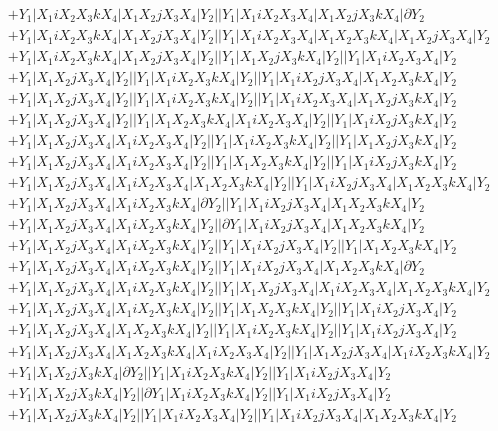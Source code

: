 \documentclass{article}[12pt]
\begin{document}
\begin{align*}
 & +Y_1|X_1iX_2X_3kX_4|X_1X_2jX_3X_4|Y_2||Y_1|X_1iX_2X_3X_4|X_1X_2jX_3kX_4|\partial Y_2\\ 
 & +Y_1|X_1iX_2X_3kX_4|X_1X_2jX_3X_4|Y_2||Y_1|X_1iX_2X_3X_4|X_1X_2X_3kX_4|X_1X_2jX_3X_4|Y_2\\ 
 & +Y_1|X_1iX_2X_3kX_4|X_1X_2jX_3X_4|Y_2||Y_1|X_1X_2jX_3kX_4|Y_2||Y_1|X_1iX_2X_3X_4|Y_2\\ 
 & +Y_1|X_1X_2jX_3X_4|Y_2||Y_1|X_1iX_2X_3kX_4|Y_2||Y_1|X_1iX_2jX_3X_4|X_1X_2X_3kX_4|Y_2\\ 
 & +Y_1|X_1X_2jX_3X_4|Y_2||Y_1|X_1iX_2X_3kX_4|Y_2||Y_1|X_1iX_2X_3X_4|X_1X_2jX_3kX_4|Y_2\\ 
 & +Y_1|X_1X_2jX_3X_4|Y_2||Y_1|X_1X_2X_3kX_4|X_1iX_2X_3X_4|Y_2||Y_1|X_1iX_2jX_3kX_4|Y_2\\ 
 & +Y_1|X_1X_2jX_3X_4|X_1iX_2X_3X_4|Y_2||Y_1|X_1iX_2X_3kX_4|Y_2||Y_1|X_1X_2jX_3kX_4|Y_2\\ 
 & +Y_1|X_1X_2jX_3X_4|X_1iX_2X_3X_4|Y_2||Y_1|X_1X_2X_3kX_4|Y_2||Y_1|X_1iX_2jX_3kX_4|Y_2\\ 
 & +Y_1|X_1X_2jX_3X_4|X_1iX_2X_3X_4|X_1X_2X_3kX_4|Y_2||Y_1|X_1iX_2jX_3X_4|X_1X_2X_3kX_4|Y_2\\ 
 & +Y_1|X_1X_2jX_3X_4|X_1iX_2X_3kX_4|\partial Y_2||Y_1|X_1iX_2jX_3X_4|X_1X_2X_3kX_4|Y_2\\ 
 & +Y_1|X_1X_2jX_3X_4|X_1iX_2X_3kX_4|Y_2||\partial Y_1|X_1iX_2jX_3X_4|X_1X_2X_3kX_4|Y_2\\ 
 & +Y_1|X_1X_2jX_3X_4|X_1iX_2X_3kX_4|Y_2||Y_1|X_1iX_2jX_3X_4|Y_2||Y_1|X_1X_2X_3kX_4|Y_2\\ 
 & +Y_1|X_1X_2jX_3X_4|X_1iX_2X_3kX_4|Y_2||Y_1|X_1iX_2jX_3X_4|X_1X_2X_3kX_4|\partial Y_2\\ 
 & +Y_1|X_1X_2jX_3X_4|X_1iX_2X_3kX_4|Y_2||Y_1|X_1X_2jX_3X_4|X_1iX_2X_3X_4|X_1X_2X_3kX_4|Y_2\\ 
 & +Y_1|X_1X_2jX_3X_4|X_1iX_2X_3kX_4|Y_2||Y_1|X_1X_2X_3kX_4|Y_2||Y_1|X_1iX_2jX_3X_4|Y_2\\ 
 & +Y_1|X_1X_2jX_3X_4|X_1X_2X_3kX_4|Y_2||Y_1|X_1iX_2X_3kX_4|Y_2||Y_1|X_1iX_2jX_3X_4|Y_2\\ 
 & +Y_1|X_1X_2jX_3X_4|X_1X_2X_3kX_4|X_1iX_2X_3X_4|Y_2||Y_1|X_1X_2jX_3X_4|X_1iX_2X_3kX_4|Y_2\\ 
 & +Y_1|X_1X_2jX_3kX_4|\partial Y_2||Y_1|X_1iX_2X_3kX_4|Y_2||Y_1|X_1iX_2jX_3X_4|Y_2\\ 
 & +Y_1|X_1X_2jX_3kX_4|Y_2||\partial Y_1|X_1iX_2X_3kX_4|Y_2||Y_1|X_1iX_2jX_3X_4|Y_2\\ 
 & +Y_1|X_1X_2jX_3kX_4|Y_2||Y_1|X_1iX_2X_3X_4|Y_2||Y_1|X_1iX_2jX_3X_4|X_1X_2X_3kX_4|Y_2\\
    \end{align*}
\end{document}
